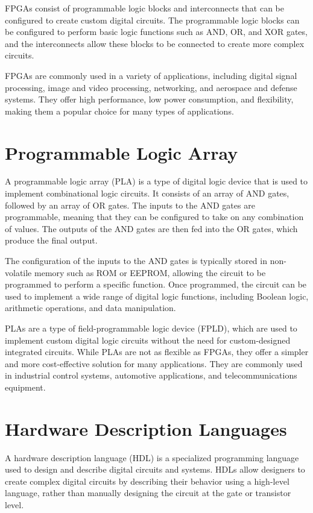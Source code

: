 FPGAs consist of programmable logic blocks and interconnects that can be configured to create custom digital circuits. The programmable logic blocks can be configured to perform basic logic functions such as AND, OR, and XOR gates, and the interconnects allow these blocks to be connected to create more complex circuits.

FPGAs are commonly used in a variety of applications, including digital signal processing, image and video processing, networking, and aerospace and defense systems. They offer high performance, low power consumption, and flexibility, making them a popular choice for many types of applications.

\section{Programmable Logic Array}
A programmable logic array (PLA) is a type of digital logic device that is used to implement combinational logic circuits. It consists of an array of AND gates, followed by an array of OR gates. The inputs to the AND gates are programmable, meaning that they can be configured to take on any combination of values. The outputs of the AND gates are then fed into the OR gates, which produce the final output.

The configuration of the inputs to the AND gates is typically stored in non-volatile memory such as ROM or EEPROM, allowing the circuit to be programmed to perform a specific function. Once programmed, the circuit can be used to implement a wide range of digital logic functions, including Boolean logic, arithmetic operations, and data manipulation.

PLAs are a type of field-programmable logic device (FPLD), which are used to implement custom digital logic circuits without the need for custom-designed integrated circuits. While PLAs are not as flexible as FPGAs, they offer a simpler and more cost-effective solution for many applications. They are commonly used in industrial control systems, automotive applications, and telecommunications equipment.

\section{Hardware Description Languages}

A hardware description language (HDL) is a specialized programming language used to design and describe digital circuits and systems. HDLs allow designers to create complex digital circuits by describing their behavior using a high-level language, rather than manually designing the circuit at the gate or transistor level.

